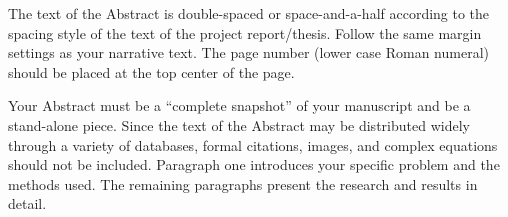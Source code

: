 
The text of the Abstract is double-spaced or space-and-a-half according to the spacing style of the text of the project report/thesis. Follow the same margin settings as your narrative text. The page number (lower case Roman numeral) should be placed at the top center of the page.

Your Abstract must be a ``complete snapshot'' of your manuscript and be a stand-alone piece. Since the text of the Abstract may be distributed widely through a variety of databases, formal citations, images, and complex equations should not be included. Paragraph one introduces your specific problem and the methods used. The remaining paragraphs present the research and results in detail.


